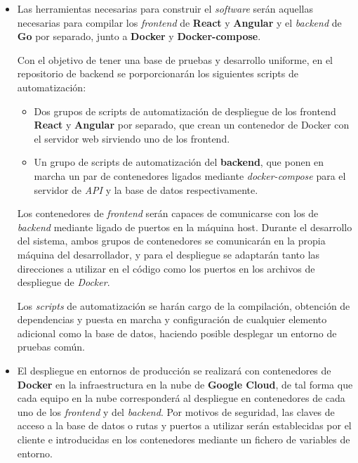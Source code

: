 \documentclass[11pt, a4paper, titlepage]{article}
\begin{document}
\begin{itemize}
    \item Las herramientas necesarias para construir el \textit{software} serán aquellas necesarias para compilar los \textit{frontend} de \textbf{React} y \textbf{Angular} y el \textit{backend} de \textbf{Go} por separado, junto a \textbf{Docker} y \textbf{Docker-compose}. \newline

    Con el objetivo de tener una base de pruebas y desarrollo uniforme, en el repositorio de backend se porporcionarán los siguientes scripts de automatización:
    \begin{itemize}
        \item Dos grupos de scripts de automatización de despliegue de los frontend \textbf{React} y \textbf{Angular} por separado, que crean un contenedor de Docker con el servidor web sirviendo uno de los frontend.

        \item Un grupo de scripts de automatización del \textbf{backend}, que ponen en marcha un par de contenedores ligados mediante \textit{docker-compose} para el servidor de \textit{API} y la base de datos respectivamente.
    \end{itemize}

    Los contenedores de \textit{frontend} serán capaces de comunicarse con los de \textit{backend} mediante ligado de puertos en la máquina host. Durante el desarrollo del sistema, ambos grupos de contenedores se comunicarán en la propia máquina del desarrollador, y para el despliegue se adaptarán tanto las direcciones a utilizar en el código como los puertos en los archivos de despliegue de \textit{Docker}.

    Los \textit{scripts} de automatización se harán cargo de la compilación, obtención de dependencias y puesta en marcha y configuración de cualquier elemento adicional como la base de datos, haciendo posible desplegar un entorno de pruebas común.

    \item El despliegue en entornos de producción se realizará con contenedores de \textbf{Docker} en la infraestructura en la nube de \textbf{Google Cloud}, de tal forma que cada equipo en la nube corresponderá al despliegue en contenedores de cada uno de los \textit{frontend} y del \textit{backend}. Por motivos de seguridad, las claves de acceso a la base de datos o rutas y puertos a utilizar serán establecidas por el cliente e introducidas en los contenedores mediante un fichero de variables de entorno.
\end{itemize}
\end{document}
